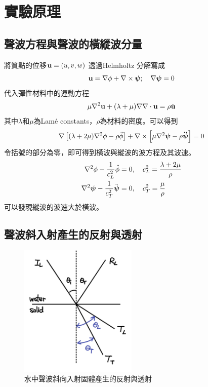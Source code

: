 \documentclass[12pt]{report}
\begin{document}
\section{實驗原理}

\subsection{聲波方程與聲波的橫縱波分量}\label{sec:wave_eqn}

將質點的位移$\boldsymbol{\mathbf{u}}=(u,v,w)$ 透過Helmholtz 分解寫成
\begin{equation}
    \boldsymbol{\mathbf{u}}=\nabla\phi+\nabla\times\boldsymbol{\mathbf{\psi}};\quad \nabla\boldsymbol{\mathbf{\psi}}=0
\end{equation}
代入彈性材料中的運動方程
\begin{equation}
    \mu \nabla^2 \boldsymbol{\mathbf{u}} + (\lambda+\mu)\nabla\nabla\cdot \boldsymbol{\mathbf{u}}=\rho \ddot{\boldsymbol{\mathbf{u}}}
\end{equation}
其中$\lambda$和$\mu$為Lamé constants，$\rho$為材料的密度。可以得到
\begin{equation}
    \nabla\left[(\lambda+2\mu)\nabla^2\phi-\rho\ddot{\phi}\right]
    +\nabla\times\left[\mu\nabla^2\boldsymbol{\mathbf{\psi}}-\rho\boldsymbol{\mathbf{\ddot{\boldsymbol{\mathbf{\psi}}}}}\right]=0
\end{equation}
令括號的部分為零，即可得到橫波與縱波的波方程及其波速。
\begin{align}
    \nabla^2\phi-\frac{1}{c_L^2}\ddot{\phi}&=0,\quad c_L^2=\frac{\lambda+2\mu}{\rho} \\
    \nabla^2\boldsymbol{\mathbf{\psi}}-\frac{1}{c_T^2}\ddot{\boldsymbol{\mathbf{\psi}}}&=0,\quad c_T^2=\frac{\mu}{\rho}
\end{align}
可以發現縱波的波速大於橫波。

\subsection{聲波斜入射產生的反射與透射}

\begin{figure}[htbp]
    \centering
    \includegraphics[width=0.5\textwidth]{f2s.jpeg}
    \caption{水中聲波斜向入射固體產生的反射與透射}
    \label{phy07}
\end{figure}
\end{document}
